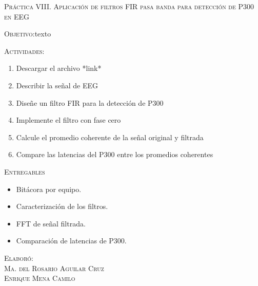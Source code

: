 \documentclass[10pt,letterpaper,spanish,twoside]{report}
\begin{document}
\docdate

\begin{center}
\textsc{\asignatura}\vspace{.2em}
\end{center}

\textsc{Práctica VIII. Aplicación de filtros FIR pasa banda para detección de P300 en EEG}

\textsc{Objetivo:}texto

\textsc{Actividades:}
\begin{enumerate}
  \item Descargar el archivo *link*
  \item Describir la señal de EEG
  \item Diseñe un filtro FIR para la detección de P300
  \item Implemente el filtro con fase cero
  \item Calcule el promedio coherente de la señal original y filtrada
  \item Compare las latencias del P300 entre los promedios coherentes  
\end{enumerate}

\textsc{Entregables}
\begin{itemize}
  \item Bitácora por equipo.
  \item Caracterización de los filtros.
  \item FFT de señal filtrada.
  \item Comparación de latencias de P300.
\end{itemize}

\vfill
\begin{flushright}
\textsc{Elaboró:\\
Ma. del Rosario Aguilar Cruz\\
Enrique Mena Camilo}
\end{flushright}
\end{document}
